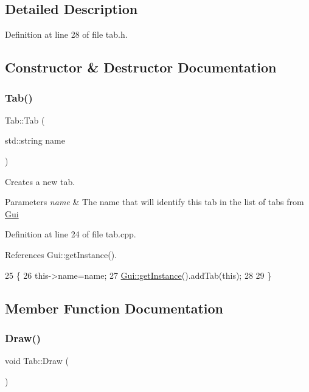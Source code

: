 \subsection{Detailed Description}


Definition at line 28 of file tab.\+h.



\subsection{Constructor \& Destructor Documentation}
\mbox{\label{class_tab_a497b3e128d1fe6625b9f3734fba8b416}} 
\subsubsection{\texorpdfstring{Tab()}{Tab()}}
{\footnotesize\ttfamily Tab\+::\+Tab (\begin{DoxyParamCaption}\item[{std\+::string}]{name }\end{DoxyParamCaption})}



Creates a new tab. 


\begin{DoxyParams}{Parameters}
{\em name} & The name that will identify this tab in the list of tabs from \hyperlink{class_gui}{Gui} \\
\hline
\end{DoxyParams}


Definition at line 24 of file tab.\+cpp.



References Gui\+::get\+Instance().


\begin{DoxyCode}
25 \{
26     this->name=name;
27     \hyperlink{class_gui_a613c787488c374d68a04886cc63127a7}{Gui::getInstance}().addTab(\textcolor{keyword}{this});
28     
29 \}
\end{DoxyCode}


\subsection{Member Function Documentation}
\mbox{\label{class_tab_ae9db0c3ae8b0b75f7c5b3493b0267482}} 
\subsubsection{\texorpdfstring{Draw()}{Draw()}}
{\footnotesize\ttfamily void Tab\+::\+Draw (\begin{DoxyParamCaption}{ }\end{DoxyParamCaption})}



